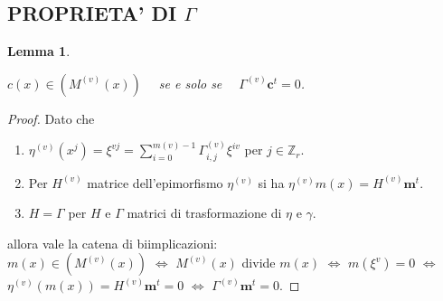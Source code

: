 \documentclass[mathserif]{beamer}
\newtheorem{lemmax}{Lemma}[section]
\newtheorem{teorema}{Teorema}
\begin{document}
% 

\subsection{PROPRIETA' DI $\Gamma$}
\begin{frame}
    \begin{lemmax}
    \begin{center}
      $c(x) \in (M^{(v)}(x))\quad $ se e solo se $ \quad \Gamma^{(v)} \mathbf{c}^{t} = 0$.
    \end{center}
    \end{lemmax}
    \begin{proof}
      Dato che
      \begin{enumerate}
	  \item $\eta^{(v)}(x^{j}) = \xi^{vj} = \sum_{i=0}^{m(v)-1}\Gamma_{i,j}^{(v)}\xi^{iv}$ per $j \in \mathbb{Z}_{r}$.
	  \item Per $H^{(v)}$ matrice dell'epimorfismo $\eta^{(v)}$ si ha $\eta^{(v)}m(x) = H^{(v)}\mathbf{m}^{t}$.
	  \item $H=\Gamma$ per $H$ e $\Gamma$ matrici di trasformazione di $\eta$ e $\gamma$.
      \end{enumerate}
      allora vale la catena di biimplicazioni:\\
      $m(x)\in (M^{(v)}(x))$ $\iff$ $M^{(v)}(x)$ divide $m(x)$ $\iff$ $m(\xi^{v}) = 0$ $\iff$ $\eta^{(v)}(m(x)) = H^{(v)}\mathbf{m}^{t} = 0$ $\iff$ $ \Gamma^{(v)}\mathbf{m}^{t} = 0$.
    \end{proof}

\end{frame}
\end{document}
